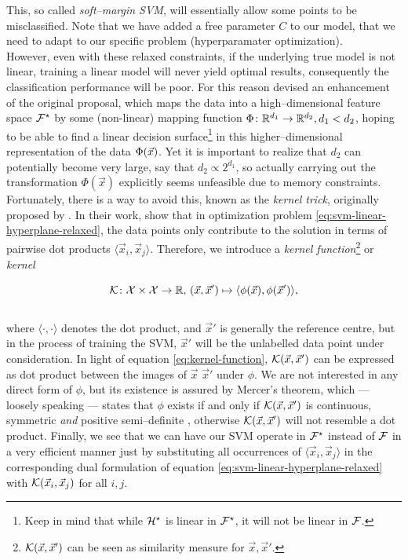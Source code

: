 This, so called \emph{soft--margin SVM}, will essentially allow some points to be misclassified. Note that we have added a free parameter $C$ to our model, that we need to adapt to our specific problem (hyperparamater optimization).\\

However, even with these relaxed constraints, if the underlying true model is not linear, training a linear model will never yield optimal results, consequently the classification performance will be poor. For this reason \citet{cortes1995} devised an enhancement of the original proposal, which maps the data into a high--dimensional feature space $\mathcal{F}^\star$ by some (non-linear) mapping function $\Phi \colon \mathbb{R}^{d_1} \to \mathbb{R}^{d_2}, d_1 < d_2$, hoping to be able to find a linear decision surface\footnote{Keep in mind that while $\mathcal{H}^\star$ is linear in $\mathcal{F}^\star$, it will not be linear in $\mathcal{F}$.} in this higher--dimensional representation of the data $\Phi(\vec x)$. Yet it is important to realize that $d_2$ can potentially become very large, \eg say that $d_2 \propto 2^{d_1}$, so actually carrying out the transformation $\Phi(\vec x)$ explicitly seems unfeasible due to memory constraints. Fortunately, there is a way to avoid this, known as the \emph{kernel trick}, originally proposed by \citet{aizerman1964}. In their work, \citet{cortes1995} show that in optimization problem \eqref{eq:svm-linear-hyperplane-relaxed}, the data points only contribute to the solution in terms of pairwise dot products $\langle \vec x_i, \vec x_j \rangle$. Therefore, we introduce a \emph{kernel function}\footnote{$\mathcal{K}(\vec x, \vec x')$ can be seen as similarity measure for $\vec x, \vec x'$.} or \emph{kernel}

\begin{equation}
\label{eq:kernel-function}
\mathcal{K} \colon \mathcal{X} \times \mathcal{X} \to \mathbb{R},\, (\vec x, \vec x') \mapsto \langle \phi(\vec x), \phi(\vec x') \rangle,
\end{equation}\\

where $\langle \cdot, \cdot \rangle$ denotes the dot product, and $\vec x'$ is generally the reference centre, but in the process of training the SVM, $\vec x'$ will be the unlabelled data point under consideration. In light of equation \eqref{eq:kernel-function}, $\mathcal{K}(\vec x, \vec x')$ can be expressed as dot product between the images of $\vec x$ \resp $\vec x'$ under $\phi$. We are not interested in any direct form of $\phi$, but its existence is assured by Mercer's theorem, which --- loosely speaking --- states that $\phi$ exists if and only if $\mathcal{K}(\vec x, \vec x')$ is continuous, symmetric \emph{and} positive semi--definite \citep{mercer1909}, otherwise $\mathcal{K}(\vec x, \vec x')$ will not resemble a dot product. Finally, we see that we can have our SVM operate in $\mathcal{F}^\star$ instead of $\mathcal{F}$ in a very efficient manner just by substituting all occurrences of $\langle \vec x_i, \vec x_j \rangle$ in the corresponding dual formulation of equation \eqref{eq:svm-linear-hyperplane-relaxed} with $\mathcal{K}({\vec x_i, \vec x_j})$ for all $i,j$. \\
 
